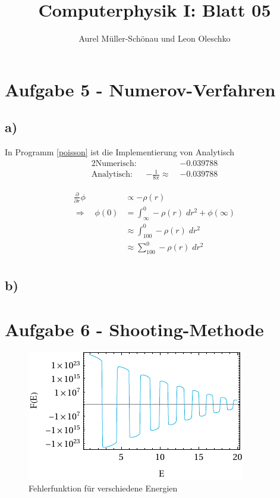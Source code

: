


\setcounter{secnumdepth}{0}



\title{Computerphysik I: Blatt 05}
\author{Aurel Müller-Schönau und Leon Oleschko}
\maketitle

\section{Aufgabe 5 - Numerov-Verfahren}
\subsection{a)}
In Programm \ref{poisson} ist die Implementierung von 
Analytisch
\begin{alignat}{2}
	\text{Numerisch: }&& -0.039788\\
	\text{Analytisch: }&-\frac{1}{8\pi} \approx\;& -0.039788
\end{alignat}

\begin{align}
	\frac{\partial}{\partial r} \phi &\propto - \rho(r)\\ 
	\Rightarrow\quad \phi(0) &= \int_{\infty}^0 - \rho(r)\;dr^2 + \phi(\infty)\\
	&\approx \int_{100}^0 - \rho(r)\;dr^2\\
	&\approx \sum_{100}^0 - \rho(r)\;dr^2\\
\end{align}

\subsection{b)}

\section{Aufgabe 6 - Shooting-Methode}

\begin{figure}[h!]
	\centering
	\includegraphics[scale = 1.388888888]{img/errorFunction.pdf}
	\caption{Fehlerfunktion für verschiedene Energien}
	\label{fig:shooting}
\end{figure}

